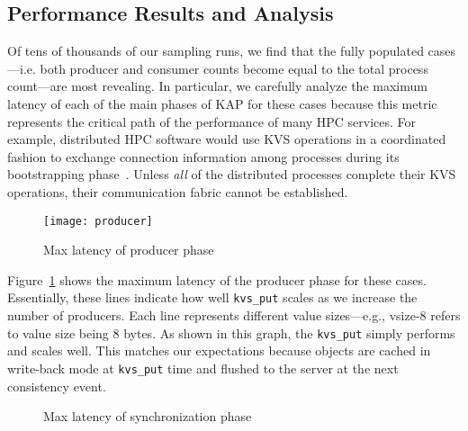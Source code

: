\subsection{Performance Results and Analysis}
\label{results}
Of tens of thousands of our sampling runs, we find that the fully populated
cases---i.e. both producer and consumer counts become equal to the total
process count---are most revealing. In particular, we carefully analyze 
the maximum latency of each of the main phases of KAP for these cases 
because this metric represents the critical path of the performance of
many HPC services. For example, distributed 
HPC software would use KVS operations in a coordinated fashion to exchange 
connection information among processes during its bootstrapping 
phase~\cite{LIBI,PMI2}. Unless {\em all} 
of the distributed processes complete their
KVS operations, their communication fabric cannot be established. 

\begin{figure}
  \centering
  \texttt{[image: producer]}
  \caption{Max latency of producer phase}
  \vspace{-.5cm}	
  \label{fig:prod}
\end{figure}

Figure~\ref{fig:prod} shows the maximum latency of the producer phase
for these cases. Essentially, these lines indicate how well {\tt kvs\_put}
scales as we increase the number of producers. Each line represents
different value sizes---e.g., vsize-8 refers to value size being
8 bytes. As shown in this graph, the {\tt kvs\_put} simply performs and
scales well. This matches our expectations because objects
are cached in write-back mode at {\tt kvs\_put} time and flushed to the
server at the next consistency event. 

\ifcomments
{}

\begin{figure}[ht]
\centering
\begin{subfigure}[With unique values]{
  \texttt{[image: sync]}
  \label{fig:sync:noredund}
}%
\end{subfigure}
\begin{subfigure}[With redundant values]{
  \texttt{[image: sync]}
  \label{fig:sync:redund}
}%
\end{subfigure}
\caption{Max latency of synchronization phase}
\label{fig:sync}
\end{figure}


